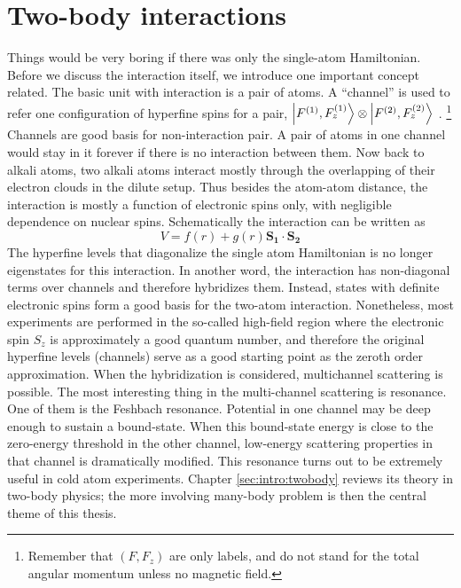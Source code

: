 \section{Two-body interactions}
Things would be very boring if there was only the single-atom Hamiltonian.  Before we discuss the interaction itself, we introduce one important concept related.   The basic unit with interaction is a pair of atoms.  A ``channel'' is used to refer one  configuration of hyperfine spins for a pair, $\left|F^{(1)},F_{z}^{(1)}\right>\otimes\left|F^{(2)},F_{z}^{(2)}\right>$ . \footnote{Remember that $(F,F_{z})$ are only labels, and do not stand for the total angular momentum unless no magnetic field.\label{foot:intro:f}}    Channels are good basis for non-interaction pair.  A pair of atoms in one channel would stay in it forever if there is no interaction between them.  Now back to alkali atoms, two alkali atoms interact mostly through the overlapping of their electron clouds in the dilute setup.  Thus besides the atom-atom distance, the interaction is mostly a function of electronic spins only, with negligible dependence on nuclear spins.  Schematically the interaction can be written as 
\begin{equation}\label{eq:intro:two}
V=f(r)+g(r)\mathbf{S_{1}}\cdot\mathbf{S_{2}}
\end{equation}
The hyperfine levels that diagonalize the single atom Hamiltonian is no longer eigenstates for this interaction.  In another word, the interaction has non-diagonal terms over channels and therefore hybridizes them. Instead, states with definite electronic spins form a good basis for the two-atom interaction.  Nonetheless, most experiments are performed in the so-called high-field region where the electronic spin $S_z$ is approximately a good quantum number, and therefore the original hyperfine levels (channels) serve as a good starting point as the zeroth order approximation.  When the hybridization is considered, multichannel scattering is possible.  The most interesting thing in the multi-channel scattering is resonance.  One of them is the Feshbach resonance.  Potential in one channel may be deep enough to sustain a bound-state. When this bound-state energy is close to the zero-energy threshold in the other channel, low-energy scattering properties in that channel is dramatically modified.  This resonance turns out to be extremely useful in   cold atom experiments.  Chapter \ref{sec:intro:twobody} reviews its theory in  two-body physics; the more involving many-body problem is then the central theme of this thesis. 

